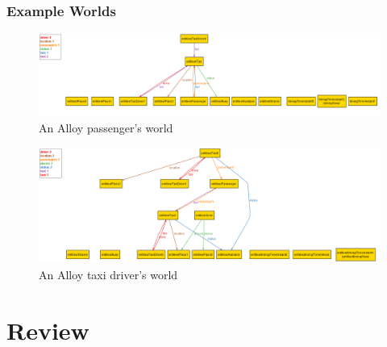 \documentclass{article}
\begin{document}
\begin{landscape}

\subsubsection{Example Worlds}


\begin{figure}[h!]
        \centering
        \includegraphics[width=1\columnwidth]{alloy/passenger-world}
        \caption{An Alloy passenger's world}
        \label{fig:alloy-passenger-world}
    \end{figure}
    
\begin{figure}[h!]
        \centering
        \includegraphics[width=1\columnwidth]{alloy/taxi-driver-world}
        \caption{An Alloy taxi driver's world}
        \label{fig:alloy-taxi-driver-world}
    \end{figure}

\end{landscape}

\section{Review}
\end{document}
